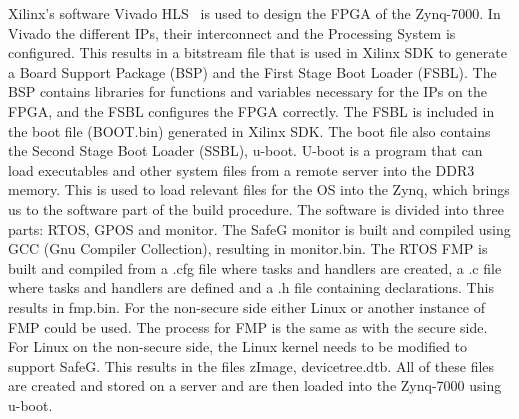 Xilinx's software Vivado HLS~\cite{website:vivado} is used to design the FPGA of the Zynq-7000. In Vivado the different IPs, their interconnect and the Processing System is configured. This results in a bitstream file that is used in Xilinx SDK to generate a Board Support Package (BSP) and the First Stage Boot Loader (FSBL). The BSP contains libraries for functions and variables necessary for the IPs on the FPGA, and the FSBL configures the FPGA correctly. The FSBL is included in the boot file (BOOT.bin) generated in Xilinx SDK. The boot file also contains the Second Stage Boot Loader (SSBL), u-boot. U-boot is a program that can load executables and other system files from a remote server into the DDR3 memory. This is used to load relevant files for the OS into the Zynq, which brings us to the software part of the build procedure. The software is divided into three parts: RTOS, GPOS and monitor. The SafeG monitor is built and compiled using GCC (Gnu Compiler Collection), resulting in monitor.bin. The RTOS FMP is built and compiled from a .cfg file where tasks and handlers are created, a .c file where tasks and handlers are defined and a .h file containing declarations. This results in fmp.bin. For the non-secure side either Linux or another instance of FMP could be used. The process for FMP is the same as with the secure side. For Linux on the non-secure side, the Linux kernel needs to be modified to support SafeG. This results in the files zImage, devicetree.dtb. All of these files are created and stored on a server and are then loaded into the Zynq-7000 using u-boot.\\



